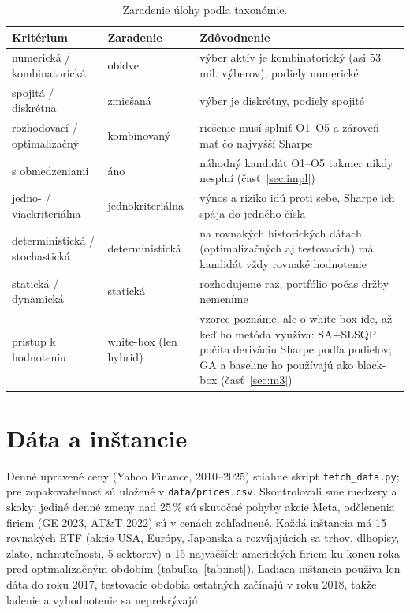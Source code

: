 \documentclass[10pt,a4paper]{article}
\begin{document}
\begin{table}[!ht]
\centering\small
\caption{Zaradenie úlohy podľa taxonómie.}
\label{tab:tax}
\footnotesize
\setlength{\tabcolsep}{4pt}
\begin{tabularx}{\textwidth}{@{}>{\raggedright\arraybackslash}p{3.6cm}>{\raggedright\arraybackslash}p{2.3cm}L@{}}
\toprule
Kritérium & Zaradenie & Zdôvodnenie \\
\midrule
numerická / kombinatorická & obidve & výber aktív je kombinatorický (asi 53 mil. výberov), podiely numerické \\
spojitá / diskrétna & zmiešaná & výber je diskrétny, podiely spojité \\
rozhodovací / optimalizačný & kombinovaný & riešenie musí splniť O1--O5 a zároveň mať čo najvyšší Sharpe \\
s obmedzeniami & áno & náhodný kandidát O1--O5 takmer nikdy nesplní (časť~\ref{sec:impl}) \\
jedno- / viackriteriálna & jednokriteriálna & výnos a riziko idú proti sebe, Sharpe ich spája do jedného čísla \\
deterministická / stochastická & deterministická & na rovnakých historických dátach (optimalizačných aj testovacích) má kandidát vždy rovnaké hodnotenie \\
statická / dynamická & statická & rozhodujeme raz, portfólio počas držby nemeníme \\
prístup k hodnoteniu & white-box (len hybrid) & vzorec poznáme, ale o white-box ide, až keď ho metóda využíva: SA+SLSQP počíta deriváciu Sharpe podľa podielov; GA a baseline ho používajú ako black-box (časť~\ref{sec:m3}) \\
\bottomrule
\end{tabularx}
\end{table}

\section{Dáta a inštancie}

Denné upravené ceny (Yahoo Finance, 2010--2025) stiahne skript \texttt{fetch\_data.py}; pre zopakovateľnosť
sú uložené v \texttt{data/prices.csv}. Skontrolovali sme medzery a skoky: jediné denné
zmeny nad 25\,\% sú skutočné pohyby akcie Meta, odčlenenia firiem (GE 2023, AT\&T 2022) sú v cenách
zohľadnené. Každá inštancia má 15 rovnakých ETF (akcie USA, Európy, Japonska a rozvíjajúcich sa trhov,
dlhopisy, zlato, nehnuteľnosti, 5 sektorov) a 15 najväčších amerických firiem ku koncu roka pred
optimalizačným obdobím (tabuľka~\ref{tab:inst}). Ladiaca inštancia používa len dáta do roku 2017,
testovacie obdobia ostatných začínajú v roku 2018, takže ladenie a vyhodnotenie sa neprekrývajú.
\end{document}
